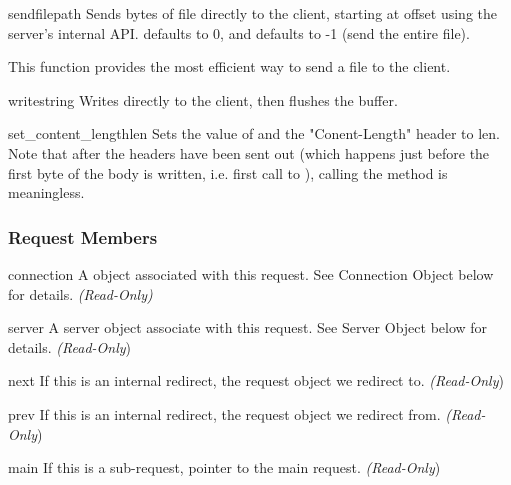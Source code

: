 \begin{methoddesc}[request]{sendfile}{path}
Sends  bytes of file  directly to the client,
starting at offset  using the server's internal
API.  defaults to 0, and  defaults to -1 (send
the entire file). 

This function provides the most efficient way to send a file to the
client.
\end{methoddesc}

\begin{methoddesc}[request]{write}{string}
Writes  directly to the client, then flushes the buffer. 
\end{methoddesc}

\begin{methoddesc}[request]{set_content_length}{len}
Sets the value of  and the "Conent-Length" header
to len. Note that after the headers have been sent out (which happens
just before the first byte of the body is written, i.e. first call to
), calling the method is meaningless.
\end{methoddesc}

\subsubsection{Request Members\label{pyapi-mprequest-mem}}

\begin{memberdesc}[request]{connection}
A  object associated with this request. See
Connection Object below for details.
\emph{(Read-Only)}
\end{memberdesc}

\begin{memberdesc}[request]{server}
A server object associate with this request. See Server Object below
for details.
\emph{(Read-Only})
\end{memberdesc}

\begin{memberdesc}[request]{next}
If this is an internal redirect, the request object we redirect to. 
\emph{(Read-Only})
\end{memberdesc}

\begin{memberdesc}[request]{prev}
If this is an internal redirect, the request object we redirect from.
\emph{(Read-Only})
\end{memberdesc}

\begin{memberdesc}[request]{main}
If this is a sub-request, pointer to the main request. 
\emph{(Read-Only})
\end{memberdesc}

